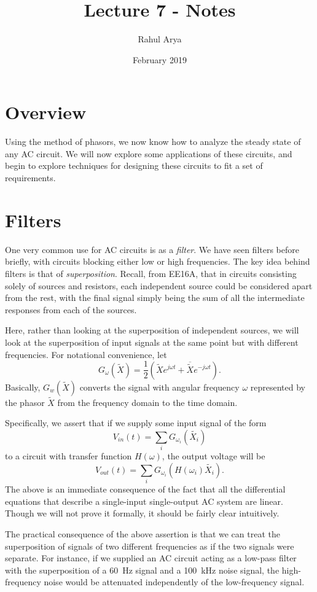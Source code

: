 \documentclass[letterpaper]{article}
\title{Lecture 7 - Notes}
\author{Rahul Arya}
\date{February 2019}
\theoremstyle{remark}
\renewcommand{\tilde}[1]{\widetilde{#1}}
\begin{document}
\maketitle

\section{Overview}
Using the method of phasors, we now know how to analyze the steady state of any AC circuit. We will now explore some applications of these circuits, and begin to explore techniques for designing these circuits to fit a set of requirements.

\section{Filters}
One very common use for AC circuits is as a \emph{filter}. We have seen filters before briefly, with circuits blocking either low or high frequencies. The key idea behind filters is that of \emph{superposition}. Recall, from EE16A, that in circuits consisting solely of sources and resistors, each independent source could be considered apart from the rest, with the final signal simply being the sum of all the intermediate responses from each of the sources.

Here, rather than looking at the superposition of independent sources, we will look at the superposition of input signals at the same point but with different frequencies. For notational convenience, let
\[
    G_\omega(\tilde{X}) = \frac{1}{2} \left(\tilde{X}e^{j\omega t} + \overline{\tilde{X}} e^{-j\omega t} \right).
\]
Basically, $G_w(\tilde{X})$ converts the signal with angular frequency $\omega$ represented by the phasor $\tilde{X}$ from the frequency domain to the time domain.

Specifically, we assert that if we supply some input signal of the form
\[
    V_{in}(t) = \sum_i G_{\omega_i}(\tilde{X_i})
\]
to a circuit with transfer function $H(\omega)$, the output voltage will be
\[
    V_{out}(t) = \sum_i G_{\omega_i}(H(\omega_i)\tilde{X_i}).
\]
The above is an immediate consequence of the fact that all the differential equations that describe a single-input single-output AC system are linear. Though we will not prove it formally, it should be fairly clear intuitively.

The practical consequence of the above assertion is that we can treat the superposition of signals of two different frequencies as if the two signals were separate. For instance, if we supplied an AC circuit acting as a low-pass filter with the superposition of a \SI{60}{\hertz} signal and a \SI{100}{\kilo\hertz} noise signal, the high-frequency noise would be attenuated independently of the low-frequency signal.
\end{document}
